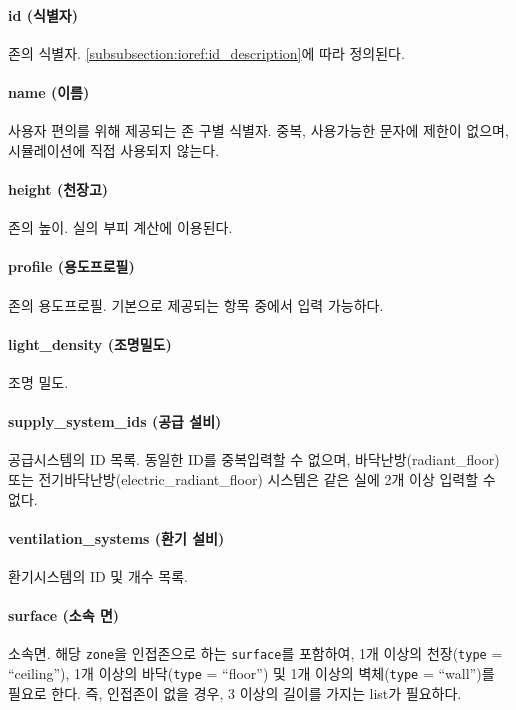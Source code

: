 \paragraph{id (식별자)} 존의 식별자. \ref{subsubsection:ioref:id_description}에 따라 정의된다.

\paragraph{name (이름)} 사용자 편의를 위해 제공되는 존 구별 식별자. 중복, 사용가능한 문자에 제한이 없으며, 시뮬레이션에 직접 사용되지 않는다.

\paragraph{height (천장고)} 존의 높이. 실의 부피 계산에 이용된다.

\paragraph{profile (용도프로필)} 존의 용도프로필. 기본으로 제공되는 항목 중에서 입력 가능하다. 

\paragraph{light\_density (조명밀도)} 조명 밀도.

\paragraph{supply\_system\_ids (공급 설비)} 공급시스템의 ID 목록. 동일한 ID를 중복입력할 수 없으며, 바닥난방(radiant\_floor) 또는 전기바닥난방(electric\_radiant\_floor) 시스템은 같은 실에 2개 이상 입력할 수 없다.

\paragraph{ventilation\_systems (환기 설비)} 환기시스템의 ID 및 개수 목록.

\paragraph{surface (소속 면)} 소속면. 해당 \texttt{zone}을 인접존으로 하는 \texttt{surface}를 포함하여, 1개 이상의 천장(\texttt{type} = ``ceiling''), 1개 이상의 바닥(\texttt{type} = ``floor'') 및 1개 이상의 벽체(\texttt{type} = ``wall'')를 필요로 한다. 즉, 인접존이 없을 경우, 3 이상의 길이를 가지는 list가 필요하다.

